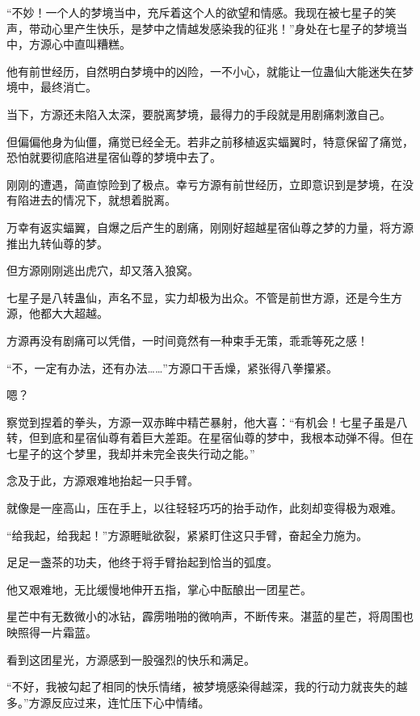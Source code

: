 
\begin{this_body}

“不妙！一个人的梦境当中，充斥着这个人的欲望和情感。我现在被七星子的笑声，带动心里产生快乐，是梦中之情越发感染我的征兆！”身处在七星子的梦境当中，方源心中直叫糟糕。

他有前世经历，自然明白梦境中的凶险，一不小心，就能让一位蛊仙大能迷失在梦境中，最终消亡。

当下，方源还未陷入太深，要脱离梦境，最得力的手段就是用剧痛刺激自己。

但偏偏他身为仙僵，痛觉已经全无。若非之前移植返实蝠翼时，特意保留了痛觉，恐怕就要彻底陷进星宿仙尊的梦境中去了。

刚刚的遭遇，简直惊险到了极点。幸亏方源有前世经历，立即意识到是梦境，在没有陷进去的情况下，就想着脱离。

万幸有返实蝠翼，自爆之后产生的剧痛，刚刚好超越星宿仙尊之梦的力量，将方源推出九转仙尊的梦。

但方源刚刚逃出虎穴，却又落入狼窝。

七星子是八转蛊仙，声名不显，实力却极为出众。不管是前世方源，还是今生方源，他都大大超越。

方源再没有剧痛可以凭借，一时间竟然有一种束手无策，乖乖等死之感！

“不，一定有办法，还有办法……”方源口干舌燥，紧张得八拳攥紧。

嗯？

察觉到捏着的拳头，方源一双赤眸中精芒暴射，他大喜：“有机会！七星子虽是八转，但到底和星宿仙尊有着巨大差距。在星宿仙尊的梦中，我根本动弹不得。但在七星子的这个梦里，我却并未完全丧失行动之能。”

念及于此，方源艰难地抬起一只手臂。

就像是一座高山，压在手上，以往轻轻巧巧的抬手动作，此刻却变得极为艰难。

“给我起，给我起！”方源睚眦欲裂，紧紧盯住这只手臂，奋起全力施为。

足足一盏茶的功夫，他终于将手臂抬起到恰当的弧度。

他又艰难地，无比缓慢地伸开五指，掌心中酝酿出一团星芒。

星芒中有无数微小的冰钻，霹雳啪啪的微响声，不断传来。湛蓝的星芒，将周围也映照得一片霜蓝。

看到这团星光，方源感到一股强烈的快乐和满足。

“不好，我被勾起了相同的快乐情绪，被梦境感染得越深，我的行动力就丧失的越多。”方源反应过来，连忙压下心中情绪。


\end{this_body}
